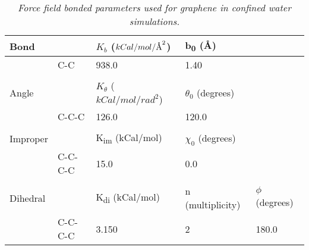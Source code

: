 \documentclass[12pt]{article}
\newcommand{\angstrom}{\textup{\AA}}
\begin{document}
\begin{table}[ht!]
\centering
\begin{tabular}{ lllll } \hline
Bond     &         & \(K_b\)  (\(kCal/mol/\angstrom^2\))      & b\textsubscript{0}  (\r A)            &          \\ \hline
         & C-C     & 938.0         & 1.40            &          \\
         &         &               &                 &          \\ \hline
Angle    &         & \(K_{\theta}\)  (\(kCal/mol/rad^2\)) & \(\theta_0\) (degrees)   &          \\ \hline
         & C-C-C   & 126.0         & 120.0           &          \\
                           &         &               &                 &          \\ \hline
Improper &         & K\textsubscript{im} (kCal/mol)       & \(\chi_0\) (degrees)     &          \\ \hline
         & C-C-C-C & 15.0          & 0.0             &          \\
                           &         &               &                 &          \\ \hline
Dihedral &         & K\textsubscript{di} (kCal/mol)       & n (multiplicity) & \(\phi\) (degrees)\\ \hline
         & C-C-C-C & 3.150         & 2               & 180.0  \\ 
\end{tabular}
\caption{\textit{Force field bonded parameters used for graphene in confined water simulations.}}
\label{table:ff_parms}
\end{table}
\end{document}
